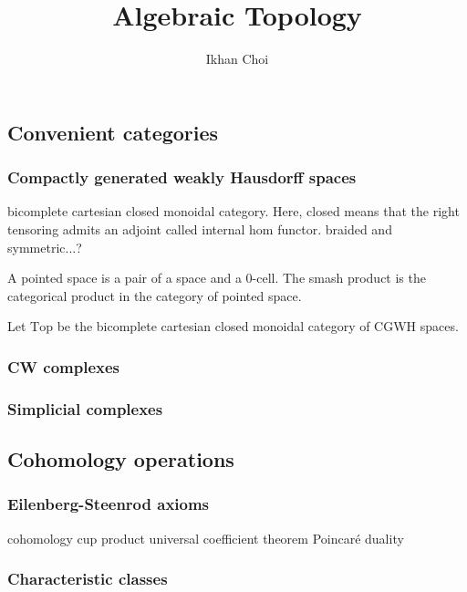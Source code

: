 \documentclass{../../large}
\begin{document}
\title{Algebraic Topology}
\author{Ikhan Choi}
\maketitle
\tableofcontents


\part{}

\chapter{Convenient categories}
\section{Compactly generated weakly Hausdorff spaces}
bicomplete cartesian closed monoidal category.
Here, closed means that the right tensoring admits an adjoint called internal hom functor.
braided and symmetric...?


A pointed space is a pair of a space and a 0-cell.
The smash product is the categorical product in the category of pointed space.


Let $\mathrm{Top}$ be the bicomplete cartesian closed monoidal category of CGWH spaces.
\section{CW complexes}



\section{Simplicial complexes}






\chapter{Cohomology operations}
\section{Eilenberg-Steenrod axioms}
cohomology
cup product
universal coefficient theorem
Poincar\'e duality


\section{Characteristic classes}
\end{document}
